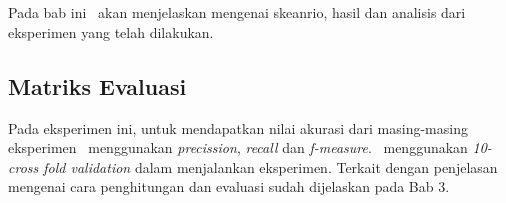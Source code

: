 \chapter{\babLima}

Pada bab ini \saya~akan menjelaskan mengenai skeanrio, hasil dan analisis dari eksperimen yang telah dilakukan.

\section{Matriks Evaluasi}
Pada eksperimen ini, untuk mendapatkan nilai akurasi dari masing-masing eksperimen \saya~menggunakan \textit{precission}, \textit{recall} dan \textit{f-measure}. \Saya~menggunakan \textit{10-cross fold validation} dalam menjalankan eksperimen. Terkait dengan penjelasan mengenai cara penghitungan dan evaluasi sudah dijelaskan pada Bab 3.

